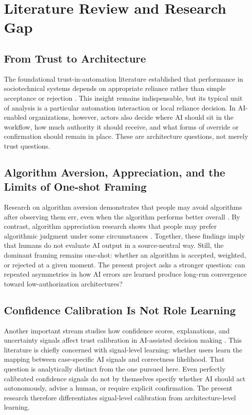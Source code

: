 \section{Literature Review and Research Gap}

\subsection{From Trust to Architecture}

The foundational trust-in-automation literature established that performance in sociotechnical systems depends on appropriate reliance rather than simple acceptance or rejection \citep{lee2004trust}. This insight remains indispensable, but its typical unit of analysis is a particular automation interaction or local reliance decision. In AI-enabled organizations, however, actors also decide where AI should sit in the workflow, how much authority it should receive, and what forms of override or confirmation should remain in place. These are architecture questions, not merely trust questions.

\subsection{Algorithm Aversion, Appreciation, and the Limits of One-shot Framing}

Research on algorithm aversion demonstrates that people may avoid algorithms after observing them err, even when the algorithm performs better overall \citep{dietvorst2015algorithm}. By contrast, algorithm appreciation research shows that people may prefer algorithmic judgment under some circumstances \citep{logg2019algorithm}. Together, these findings imply that humans do not evaluate AI output in a source-neutral way. Still, the dominant framing remains one-shot: whether an algorithm is accepted, weighted, or rejected at a given moment. The present project asks a stronger question: can repeated asymmetries in how AI errors are learned produce long-run convergence toward low-authorization architectures?

\subsection{Confidence Calibration Is Not Role Learning}

Another important stream studies how confidence scores, explanations, and uncertainty signals affect trust calibration in AI-assisted decision making \citep{zhang2020confidence,ma2023trust}. This literature is chiefly concerned with signal-level learning: whether users learn the mapping between case-specific AI signals and correctness likelihood. That question is analytically distinct from the one pursued here. Even perfectly calibrated confidence signals do not by themselves specify whether AI should act autonomously, advise a human, or require explicit confirmation. The present research therefore differentiates signal-level calibration from architecture-level learning.

